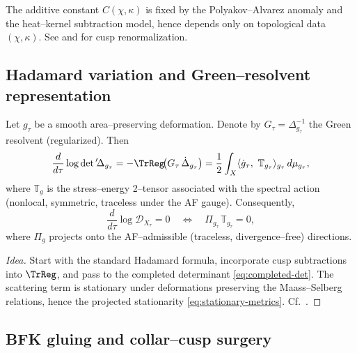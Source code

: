\begin{remark}
The additive constant $C(\chi,\kappa)$ is fixed by the Polyakov–Alvarez anomaly and the heat–kernel subtraction model, hence depends only on topological data $(\chi,\kappa)$. See \cite{Osgood1988} and \cite{Borthwick} for cusp renormalization. %
\end{remark}

\subsection{Hadamard variation and Green–resolvent representation}
\label{subsec:hadamard}
\relax\hspace{0pt}

Let $g_\tau$ be a smooth area–preserving deformation. Denote by $G_\tau=\Delta_{g_\tau}^{-1}$ the Green resolvent (regularized). Then
\begin{equation}\label{eq:var-logdet}
\frac{d}{d\tau}\log\det{}'\!\Delta_{g_\tau}
= -\TrReg\!\big(G_\tau\,\dot{\Delta}_{g_\tau}\big)
= \frac{1}{2}\int_X \langle \dot{g}_\tau,\ \mathbb{T}_{g_\tau}\rangle_{g_\tau}\,d\mu_{g_\tau},
\end{equation}
where $\mathbb{T}_{g}$ is the stress–energy 2–tensor associated with the spectral action (nonlocal, symmetric, traceless under the AF gauge). Consequently,
\begin{equation}\label{eq:stationary-metrics}
\frac{d}{d\tau}\log\mathscr{D}_{X_\tau}=0
\quad\Longleftrightarrow\quad
\Pi_{g_\tau}\,\mathbb{T}_{g_\tau}=0,
\end{equation}
where $\Pi_g$ projects onto the AF–admissible (traceless, divergence–free) directions. %

\begin{proof}[Idea]
Start with the standard Hadamard formula, incorporate cusp subtractions into $\TrReg$, and pass to the completed determinant \eqref{eq:completed-det}. The scattering term is stationary under deformations preserving the Maass–Selberg relations, hence the projected stationarity \eqref{eq:stationary-metrics}. Cf.\ \cite{Osgood1988,Borthwick}. %
\end{proof}

\subsection{BFK gluing and collar–cusp surgery}
\label{subsec:bfk-glue}
\relax\hspace{0pt}

